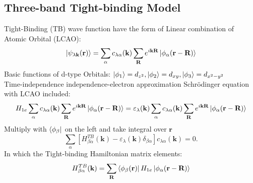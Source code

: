 \documentclass{beamer}
\begin{document}
	\subsection{Three-band Tight-binding Model}
	\begin{frame}
		Tight-Binding (TB) wave function have the form of Linear combination of Atomic Orbital (LCAO):
		\begin{equation}
			\ket{\psi_{\lambda \textbf{k}}(\textbf{r})} = \sum_{\alpha} c_{\lambda \alpha} (\textbf{k}) \sum_{\textbf{R}} e^{i\textbf{k}\textbf{R}} \ket{\phi_{\alpha}(\textbf{r}-\textbf{R})}
		\end{equation}
		Basic functions of d-type Orbitals: $\ket{\phi_1} = d_{z^2}, \ket{\phi_2} = d_{xy}, \ket{\phi_3} = d_{x^2- y^2}$\\
		Time-independence independence-electron approximation Schrödinger equation with LCAO included:
		\begin{equation*}
			H_{1e} \sum_{\alpha} c_{\lambda \alpha} (\textbf{k}) \sum_{\textbf{R}} e^{i\textbf{k}\textbf{R}} \ket{\phi_{\alpha}(\textbf{r}-\textbf{R})} = \varepsilon_{\lambda} (\textbf{k}) \sum_{\alpha} c_{\lambda \alpha} (\textbf{k}) \sum_{\textbf{R}} e^{i\textbf{k}\textbf{R}} \ket{\phi_{\alpha}(\textbf{r}-\textbf{R})}
		\end{equation*}
		Multiply with $\bra{\phi_{\beta}}$ on the left and take integral over $\textbf{r}$
		\begin{equation}
			\sum_{\alpha} [H^{TB}_{\beta \alpha}(\textbf{k}) - \varepsilon_{\lambda}(\textbf{k})\delta_{\beta\alpha}]c_{\lambda \alpha}(\textbf{k}) = 0.
		\end{equation}
		In which the Tight-binding Hamiltonian matrix elements:
		\begin{equation}
			H^{TB}_{\beta \alpha}(\textbf{k}) = \sum_{\textbf{R}} \bra{\phi_{\beta} (\textbf{r})} H_{1e}\ket{\phi_{\alpha}(\textbf{r}-\textbf{R})}
		\end{equation} 
	\end{frame}
\end{document}
